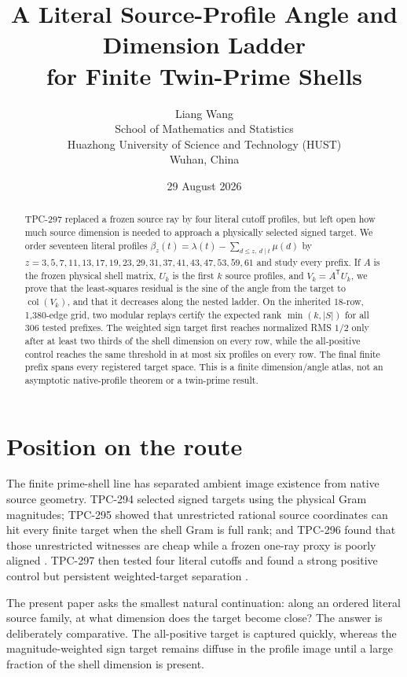 \documentclass[10pt]{article}
\title{A Literal Source-Profile Angle and Dimension Ladder\\
for Finite Twin-Prime Shells}
\author{Liang Wang\\
School of Mathematics and Statistics\\
Huazhong University of Science and Technology (HUST)\\
Wuhan, China}
\date{29 August 2026}
\begin{document}
\maketitle

\begin{abstract}
TPC-297 replaced a frozen source ray by four literal cutoff profiles, but
left open how much source dimension is needed to approach a physically
selected signed target.  We order seventeen literal profiles
$\beta_z(t)=\lambda(t)-\sum_{d\leq z,\ d\mid t}\mu(d)$ by
$z=3,5,7,11,13,17,19,23,29,31,37,41,43,47,53,59,61$ and study every
prefix.  If $A$ is the frozen physical shell matrix, $U_k$ is the first
$k$ source profiles, and $V_k=A^{\mathsf T}U_k$, we prove that the
least-squares residual is the sine of the angle from the target to
$\operatorname{col}(V_k)$, and that it decreases along the nested ladder.
On the inherited 18-row, 1,380-edge grid, two modular replays certify the
expected rank $\min(k,|S|)$ for all 306 tested prefixes.  The weighted sign
target first reaches normalized RMS $1/2$ only after at least two thirds of
the shell dimension on every row, while the all-positive control reaches the
same threshold in at most six profiles on every row.  The final finite prefix
spans every registered target space.  This is a finite dimension/angle atlas,
not an asymptotic native-profile theorem or a twin-prime result.
\end{abstract}

\section{Position on the route}

The finite prime-shell line has separated ambient image existence from native
source geometry.  TPC-294 selected signed targets using the physical Gram
magnitudes; TPC-295 showed that unrestricted rational source coordinates can
hit every finite target when the shell Gram is full rank; and TPC-296 found
that those unrestricted witnesses are cheap while a frozen one-ray proxy is
poorly aligned \cite{tpc295,tpc296}.  TPC-297 then tested four literal
cutoffs and found a strong positive control but persistent weighted-target
separation \cite{tpc297}.

The present paper asks the smallest natural continuation: along an ordered
literal source family, at what dimension does the target become close?  The
answer is deliberately comparative.  The all-positive target is captured
quickly, whereas the magnitude-weighted sign target remains diffuse in the
profile image until a large fraction of the shell dimension is present.
\end{document}
